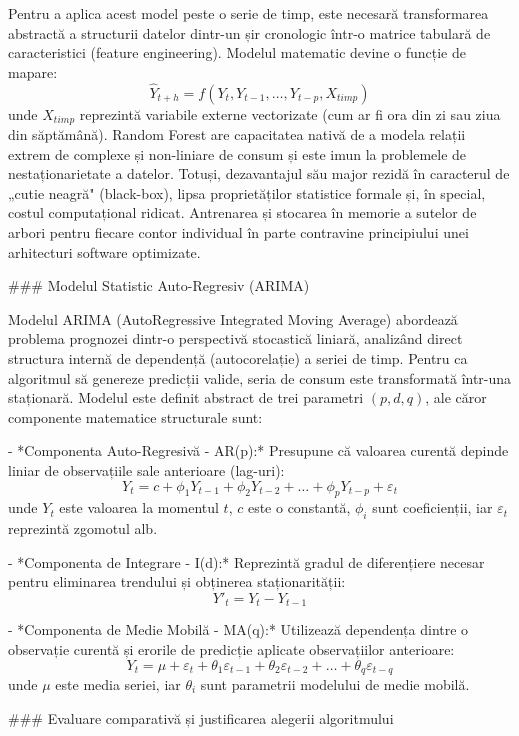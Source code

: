 Pentru a aplica acest model peste o serie de timp, este necesară
transformarea abstractă a structurii datelor dintr-un șir cronologic
într-o matrice tabulară de caracteristici (feature engineering). Modelul
matematic devine o funcție de mapare:
$$\hat{Y}_{t+h} = f(Y_t, Y_{t-1}, \dots, Y_{t-p}, X_{timp})$$ unde
$X_{timp}$ reprezintă variabile externe vectorizate (cum ar fi ora din
zi sau ziua din săptămână). Random Forest are capacitatea nativă de a
modela relații extrem de complexe și non-liniare de consum și este imun
la problemele de nestaționarietate a datelor. Totuși, dezavantajul său
major rezidă în caracterul de „cutie neagră" (black-box), lipsa
proprietăților statistice formale și, în special, costul computațional
ridicat. Antrenarea și stocarea în memorie a sutelor de arbori pentru
fiecare contor individual în parte contravine principiului unei
arhitecturi software optimizate.

### Modelul Statistic Auto-Regresiv (ARIMA)

Modelul ARIMA (AutoRegressive Integrated Moving Average) abordează
problema prognozei dintr-o perspectivă stocastică liniară, analizând
direct structura internă de dependență (autocorelație) a seriei de timp.
Pentru ca algoritmul să genereze predicții valide, seria de consum este
transformată într-una staționară. Modelul este definit abstract de trei
parametri $(p, d, q)$, ale căror componente matematice structurale sunt:

- *Componenta Auto-Regresivă - AR(p):* Presupune că valoarea curentă
  depinde liniar de observațiile sale anterioare (lag-uri):
  $$Y_t = c + \phi_1 Y_{t-1} + \phi_2 Y_{t-2} + \dots + \phi_p Y_{t-p} + \varepsilon_t$$
  unde $Y_t$ este valoarea la momentul $t$, $c$ este o constantă,
  $\phi_i$ sunt coeficienții, iar $\varepsilon_t$ reprezintă zgomotul
  alb.

- *Componenta de Integrare - I(d):* Reprezintă gradul de diferențiere
  necesar pentru eliminarea trendului și obținerea staționarității:
  $$Y'_t = Y_t - Y_{t-1}$$

- *Componenta de Medie Mobilă - MA(q):* Utilizează dependența dintre o
  observație curentă și erorile de predicție aplicate observațiilor
  anterioare:
  $$Y_t = \mu + \varepsilon_t + \theta_1 \varepsilon_{t-1} + \theta_2 \varepsilon_{t-2} + \dots + \theta_q \varepsilon_{t-q}$$
  unde $\mu$ este media seriei, iar $\theta_i$ sunt parametrii modelului
  de medie mobilă.

### Evaluare comparativă și justificarea alegerii algoritmului

